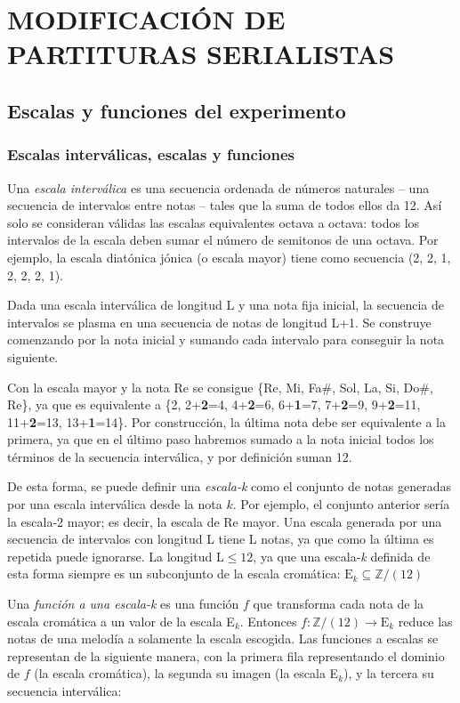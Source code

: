 	\chapter{MODIFICACIÓN DE PARTITURAS SERIALISTAS}
		
	\section{Escalas y funciones del experimento}
	\subsection{Escalas interválicas, escalas y funciones}
	
		Una \textit{escala interválica} es una secuencia ordenada de números naturales -- una secuencia de intervalos entre notas -- tales que la suma de todos ellos da 12. Así solo se consideran válidas las escalas equivalentes octava a octava: todos los intervalos de la escala deben sumar el número de semitonos de una octava. Por ejemplo, la escala diatónica jónica (o escala mayor) tiene como secuencia (2, 2, 1, 2, 2, 2, 1).
		
		Dada una escala interválica de longitud L y una nota fija inicial, la secuencia de intervalos se plasma en una secuencia de notas de longitud L+1. Se construye comenzando por la nota inicial y sumando cada intervalo para conseguir la nota siguiente. 
		
		Con la escala mayor y la nota Re se consigue \{Re, Mi, Fa$\#$, Sol, La, Si, Do$\#$, Re\}, ya que es equivalente a \{2, 2+\textbf{2}=4, 4+\textbf{2}=6, 6+\textbf{1}=7, 7+\textbf{2}=9, 9+\textbf{2}=11, 11+\textbf{2}=13, 13+\textbf{1}=14\}. Por construcción, la última nota debe ser equivalente a la primera, ya que en el último paso habremos sumado a la nota inicial todos los términos de la secuencia interválica, y por definición suman 12.
		
		De esta forma, se puede definir una \textit{escala-k} como el conjunto de notas generadas por una escala interválica desde la nota $k$. Por ejemplo, el conjunto anterior sería la escala-2 mayor; es decir, la escala de Re mayor. Una escala generada por una secuencia de intervalos con longitud L tiene L notas, ya que como la última es repetida puede ignorarse. La longitud $\text{L}\leq 12$, ya que una escala-\textit{k} definida de esta forma siempre es un subconjunto de la escala cromática: $\text{E}_k\subseteq\mathbb{Z}/(12)$
		
		Una \textit{función a una escala-k} es una función $f$ que transforma cada nota de la escala cromática a un valor de la escala E$_k$. Entonces $f : \mathbb{Z}/(12) \rightarrow \text{E}_k$ reduce las notas de una melodía a solamente la escala escogida. Las funciones a escalas se representan de la siguiente manera, con la primera fila representando el dominio de $f$ (la escala cromática), la segunda su imagen (la escala E$_k$), y la tercera su secuencia interválica:
		
